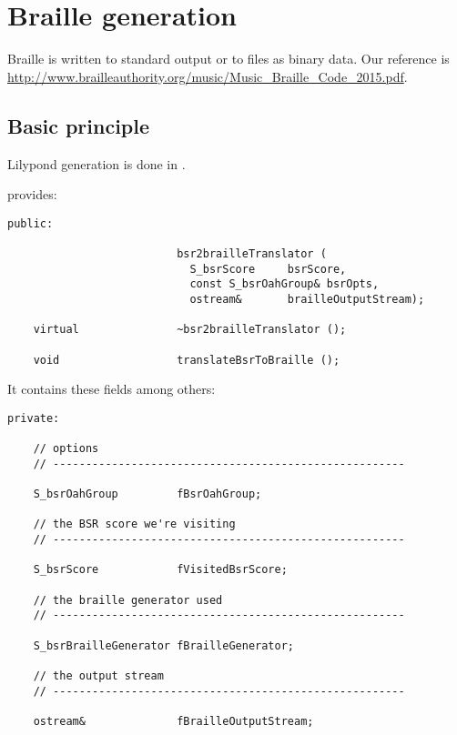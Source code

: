 
\chapter{Braille generation}


Braille is written to standard output or to files as binary data. Our reference is \url{http://www.brailleauthority.org/music/Music_Braille_Code_2015.pdf}.


\section{Basic principle}

Lilypond generation is done in .

 provides:
\begin{lstlisting}[language=CPlusPlus]
  public:

                          bsr2brailleTranslator (
                            S_bsrScore     bsrScore,
                            const S_bsrOahGroup& bsrOpts,
                            ostream&       brailleOutputStream);

    virtual               ~bsr2brailleTranslator ();

    void                  translateBsrToBraille ();
\end{lstlisting}

It contains these fields among others:
\begin{lstlisting}[language=CPlusPlus]
  private:

    // options
    // ------------------------------------------------------

    S_bsrOahGroup         fBsrOahGroup;

    // the BSR score we're visiting
    // ------------------------------------------------------

    S_bsrScore            fVisitedBsrScore;

    // the braille generator used
    // ------------------------------------------------------

    S_bsrBrailleGenerator fBrailleGenerator;

    // the output stream
    // ------------------------------------------------------

    ostream&              fBrailleOutputStream;
\end{lstlisting}



